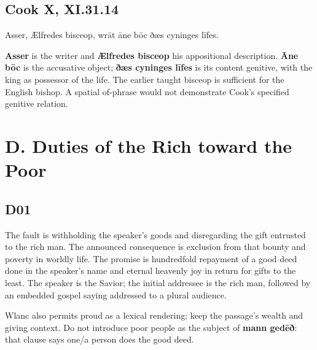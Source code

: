\subsection*{Cook X, XI.31.14}

\par\begin{minipage}{\linewidth}\raggedright
Asser, Ælfredes bisceop, wrāt āne bōc ðæs cyninges līfes.

\textbf{Asser} is the writer and \textbf{Ælfredes bisceop} his appositional description. \textbf{Āne bōc} is the accusative object; \textbf{ðæs cyninges līfes} is its content genitive, with the king as possessor of the life. The earlier taught bisceop is sufficient for the English bishop. A spatial of-phrase would not demonstrate Cook’s specified genitive relation.

\end{minipage}\par\addvspace{4pt}

\par\begin{minipage}{\linewidth}\raggedright
\section*{D. Duties of the Rich toward the Poor}

\subsection*{D01}


The fault is withholding the speaker’s goods and disregarding the gift entrusted to the rich man. The announced consequence is exclusion from that bounty and poverty in worldly life. The promise is hundredfold repayment of a good deed done in the speaker’s name and eternal heavenly joy in return for gifts to the least. The speaker is the Savior; the initial addressee is the rich man, followed by an embedded gospel saying addressed to a plural audience.

Wlanc also permits proud as a lexical rendering; keep the passage’s wealth and giving context. Do not introduce poor people as the subject of \textbf{mann gedēð}: that clause says one/\allowbreak{}a person does the good deed.

\end{minipage}\par\addvspace{4pt}

